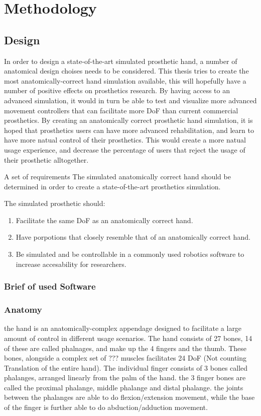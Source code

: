 \documentclass[../main.tex]{subfiles}
\begin{document}
\section{Methodology}

\subsection{Design}

In order to design a state-of-the-art simulated prosthetic hand, a number of anatomical design choises needs to be considered.
This thesis tries to create the most anatomically-correct hand simulation available, this will hopefully have a number of positive effects on prosthetics research.
By having access to an advanced simulation, it would in turn be able to test and visualize more advanced movement controllers that can facilitate more DoF than current commercial prosthetics. 
By creating an anatomically correct prosthetic hand simulation, it is hoped that prosthetics users can have more advanced rehabilitation, and learn to have more natual control of their prosthetics. This would create a more natual usage experience, and decrease the percentage of users that reject the usage of their prosthetic alltogether.

A set of requirements The simulated anatomically correct hand should be determined in order to create a state-of-the-art prosthetics simulation.

The simulated prosthetic should:

\begin{enumerate}
\item Facilitate the same DoF as an anatomically correct hand.
\item Have porpotions that closely resemble that of an anatomically correct hand.
\item Be simulated and be controllable in a commonly used robotics software to increase accesability for researchers.
\end{enumerate}


\subsubsection{Brief of used Software}

\subsubsection{Anatomy}

the hand is an anatomically-complex appendage designed to facilitate a large amount of control in different usage scenarios.
The hand consists of 27 bones, 14 of these are called phalnages, and make up the 4 fingers and the thumb. These bones, alongside a complex set of ??? muscles facilitates 24 DoF (Not counting Translation of the entire hand).
The individual finger consists of 3 bones called \gls{phalanges}, arranged linearly from the palm of the hand.
the 3 finger bones are called the proximal phalange, middle phalange and distal phalange.
the joints between the phalanges are able to do \gls{flexion/extension} movement, while the base of the finger is further able to do \gls{abduction/adduction} movement.
\end{document}
